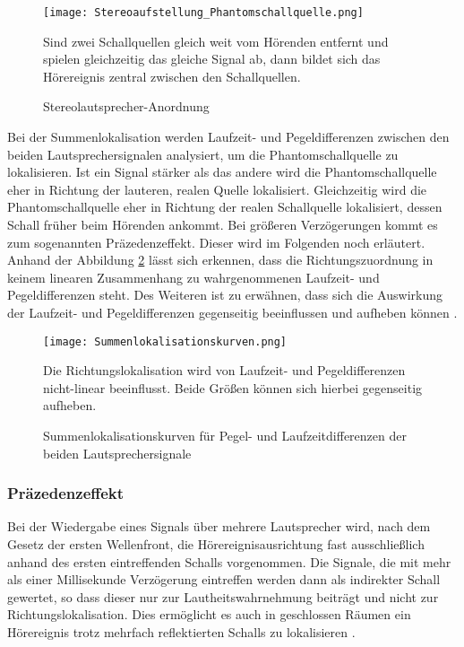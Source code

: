 \begin{figure}[H]
\centering
\texttt{[image: Stereoaufstellung\_Phantomschallquelle.png]}
\caption{Stereolautsprecher-Anordnung} 
Sind zwei Schallquellen gleich weit vom Hörenden entfernt und spielen gleichzeitig das gleiche Signal ab, dann bildet sich das Hörereignis zentral zwischen den Schallquellen.
\label{fig:Stereoaufstellung_Phantomschallquelle}
\end{figure}

Bei der Summenlokalisation werden Laufzeit- und Pegeldifferenzen zwischen den beiden Lautsprechersignalen analysiert, um die Phantomschallquelle zu lokalisieren. Ist ein Signal stärker als das andere  wird die Phantomschallquelle eher in Richtung der lauteren, realen Quelle lokalisiert. Gleichzeitig wird die Phantomschallquelle eher in Richtung der realen Schallquelle lokalisiert, dessen Schall früher beim Hörenden ankommt. Bei größeren Verzögerungen kommt es zum sogenannten Präzedenzeffekt. Dieser wird im Folgenden noch erläutert. \\ 

Anhand der Abbildung \ref{fig:Summenlokalisationskurven} lässt sich erkennen, dass die Richtungszuordnung in keinem linearen Zusammenhang zu wahrgenommenen Laufzeit- und Pegeldifferenzen steht. Des Weiteren ist zu erwähnen, dass sich die Auswirkung der Laufzeit- und Pegeldifferenzen gegenseitig beeinflussen und aufheben können \cite[S.103]{HdA08}. 
 
\begin{figure}[H]
\centering
\texttt{[image: Summenlokalisationskurven.png]}
\caption{Summenlokalisationskurven für Pegel- und Laufzeitdifferenzen der beiden Lautsprechersignale} 
Die Richtungslokalisation wird von Laufzeit- und Pegeldifferenzen nicht-linear beeinflusst. Beide Größen können sich hierbei gegenseitig aufheben. 
\label{fig:Summenlokalisationskurven}
\end{figure}

\subsubsection{Präzedenzeffekt}

Bei der Wiedergabe eines Signals über mehrere Lautsprecher wird, nach dem Gesetz der ersten Wellenfront, die Hörereignisausrichtung fast ausschließlich anhand des ersten eintreffenden Schalls vorgenommen. Die Signale, die mit mehr als einer Millisekunde Verzögerung eintreffen werden dann als indirekter Schall gewertet, so dass dieser nur zur Lautheitswahrnehmung beiträgt und nicht zur Richtungslokalisation. Dies ermöglicht es auch in geschlossen Räumen ein Hörereignis trotz mehrfach reflektierten Schalls zu lokalisieren \cite[S.103]{HdA08}. \\

